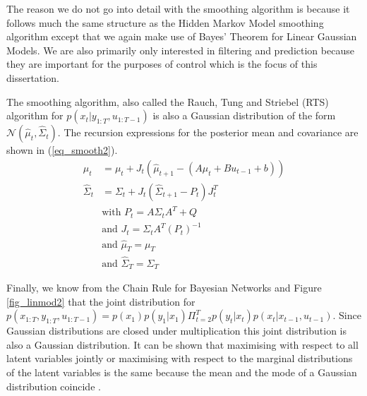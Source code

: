 \documentclass[../masters.tex]{subfiles}
\begin{document}
The reason we do not go into detail with the smoothing algorithm is because it follows much the same structure as the Hidden Markov Model smoothing algorithm except that we again make use of Bayes' Theorem for Linear Gaussian Models. We are also primarily only interested in filtering and prediction because they are important for the purposes of control which is the focus of this dissertation.

The smoothing algorithm, also called the Rauch, Tung and Striebel (RTS) algorithm for $p(x_t|y_{1:T},u_{1:T-1})$ is also a Gaussian distribution of the form $\mathcal{N}(\hat{\mu}_t, \hat{\Sigma}_t)$. The recursion expressions for the posterior mean and covariance are shown in (\ref{eq_smooth2}).
\begin{equation}
\begin{aligned}
\hat{\mu}_t &= \mu_t + J_t\left(\hat{\mu}_{t+1}-(A\mu_t+Bu_{t-1}+b)\right) \\
\hat{\Sigma}_t &= \Sigma_t + J_t(\hat{\Sigma}_{t+1}-P_t)J^T_t \\
&\text{with } P_t = A\Sigma_tA^T + Q \\
&\text{and } J_t = \Sigma_t A^T (P_t)^{-1}\\
&\text{and } \hat{\mu}_T = \mu_T\\
&\text{and } \hat{\Sigma}_T = \Sigma_T
\end{aligned}
\label{eq_smooth2}
\end{equation}

Finally, we know from the Chain Rule for Bayesian Networks and Figure \ref{fig_linmod2} that the joint distribution for $p(x_{1:T},y_{1:T}, u_{1:T-1}) = p(x_1)p(y_1|x_1)\Pi^T_{t=2} p(y_t|x_t)p(x_{t}|x_{t-1},u_{t-1})$. Since Gaussian distributions are closed under multiplication this joint distribution is also a Gaussian distribution. It can be shown that maximising with respect to all latent variables jointly or maximising with respect to the marginal distributions of the latent variables is the same because the mean and the mode of a Gaussian distribution coincide \cite{barber}.
\end{document}
